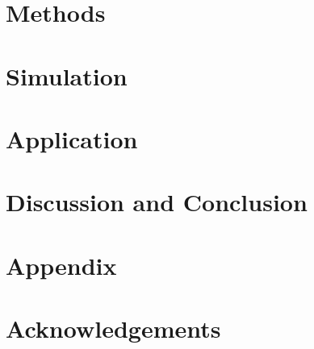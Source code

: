 \documentclass[12pt, letterpaper]{article}
\begin{document}
\section{Methods}
\label{sec:methods}


\section{Simulation}
\label{sec:somulation}


\section{Application}
\label{sec:application}


\section{Discussion and Conclusion}
\label{sec:discandconclus}


\section{Appendix}
\label{sec:appendix}


\section{Acknowledgements}
\label{sec:acknow}



\end{document}
